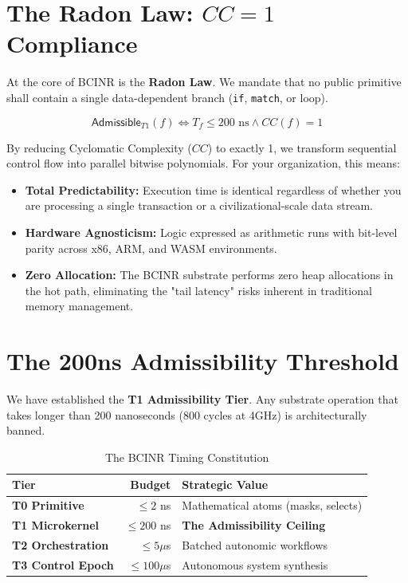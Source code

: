 \documentclass[11pt,a4paper]{article}
\begin{document}
\section{The Radon Law: $CC=1$ Compliance}
At the core of BCINR is the \textbf{Radon Law}. We mandate that no public primitive shall contain a single data-dependent branch (\texttt{if}, \texttt{match}, or loop).

\begin{equation}
\mathsf{Admissible}_{T1}(f) \iff T_f \le 200\text{ ns} \wedge CC(f) = 1
\end{equation}

By reducing Cyclomatic Complexity ($CC$) to exactly 1, we transform sequential control flow into parallel bitwise polynomials. For your organization, this means:
\begin{itemize}
    \item \textbf{Total Predictability:} Execution time is identical regardless of whether you are processing a single transaction or a civilizational-scale data stream.
    \item \textbf{Hardware Agnosticism:} Logic expressed as arithmetic runs with bit-level parity across x86, ARM, and WASM environments.
    \item \textbf{Zero Allocation:} The BCINR substrate performs zero heap allocations in the hot path, eliminating the "tail latency" risks inherent in traditional memory management.
\end{itemize}

\section{The 200ns Admissibility Threshold}
We have established the \textbf{T1 Admissibility Tier}. Any substrate operation that takes longer than 200 nanoseconds (800 cycles at 4GHz) is architecturally banned. 

\begin{table}[h!]
\centering
\begin{tabular}{|l|r|l|}
\hline
\textbf{Tier} & \textbf{Budget} & \textbf{Strategic Value} \\ \hline
\textbf{T0 Primitive} & $\le 2$ ns & Mathematical atoms (masks, selects) \\ \hline
\textbf{T1 Microkernel} & $\le 200$ ns & \textbf{The Admissibility Ceiling} \\ \hline
\textbf{T2 Orchestration} & $\le 5 \mu$s & Batched autonomic workflows \\ \hline
\textbf{T3 Control Epoch} & $\le 100 \mu$s & Autonomous system synthesis \\ \hline
\end{tabular}
\caption{The BCINR Timing Constitution}
\end{table}
\end{document}
